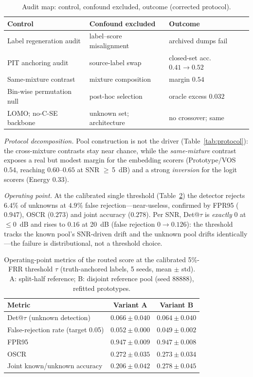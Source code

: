 \documentclass[journal,letterpaper]{IEEEtran}
\begin{document}
\begin{table}[!t]
\centering
\caption{Audit map: control, confound excluded, outcome (corrected
protocol).}
\label{tab:audit}
\scriptsize\setlength{\tabcolsep}{3pt}
\begin{tabular}{@{}lll@{}}
\toprule
Control & Confound excluded & Outcome \\
\midrule
Label regeneration audit & label--score misalignment & archived dumps fail \\
PIT anchoring audit & source-label swap & closed-set acc.\ $0.41{\to}0.52$ \\
Same-mixture contrast & mixture composition & margin $0.54$ \\
Bin-wise permutation null & post-hoc selection & oracle excess $0.032$ \\
LOMO; no-C-SE backbone & unknown set; architecture & no crossover; same \\
\bottomrule
\end{tabular}
\end{table}

\emph{Protocol decomposition.} Pool construction is not the driver
(Table~\ref{tab:protocol}): the cross-mixture contrasts stay near
chance, while the \emph{same-mixture} contrast exposes a real but
modest margin for the embedding scorers (Prototype/VOS $0.54$,
reaching $0.60$--$0.65$ at SNR ${\geq}\,$\SI{5}{dB}) and a strong
\emph{inversion} for the logit scorers (Energy $0.33$).

\emph{Operating point.} At the calibrated single threshold
(Table~\ref{tab:op}) the detector rejects $6.4\%$ of unknowns at
$4.9\%$ false rejection---near-useless, confirmed by FPR95 ($0.947$),
OSCR ($0.273$) and joint accuracy ($0.278$).
Per SNR, Det@$\tau$ is \emph{exactly} $0$ at $\leq$\SI{0}{dB} and
rises to $0.16$ at \SI{20}{dB} (false rejection $0 \to 0.126$): the
threshold tracks the known pool's SNR-driven drift and the unknown pool
drifts identically---the failure is distributional, not a threshold
choice.

\begin{table}[!t]
\centering
\caption{Operating-point metrics of the routed score at the calibrated
5\%-FRR threshold $\tau$ (truth-anchored labels, 5 seeds, mean $\pm$
std). A: split-half reference; B: disjoint reference pool (seed
88888), refitted prototypes.}
\label{tab:op}
\scriptsize\setlength{\tabcolsep}{4pt}
\begin{tabular}{lcc}
\toprule
Metric & Variant A & Variant B \\
\midrule
Det@$\tau$ (unknown detection) & $0.066\pm0.040$ & $0.064\pm0.040$ \\
False-rejection rate (target 0.05) & $0.052\pm0.000$ & $0.049\pm0.002$ \\
FPR95                          & $0.947\pm0.009$ & $0.947\pm0.008$ \\
OSCR~\cite{dhamija2018oscr}    & $0.272\pm0.035$ & $0.273\pm0.034$ \\
Joint known/unknown accuracy   & $0.206\pm0.042$ & $0.278\pm0.045$ \\
\bottomrule
\end{tabular}
\end{table}
\end{document}
